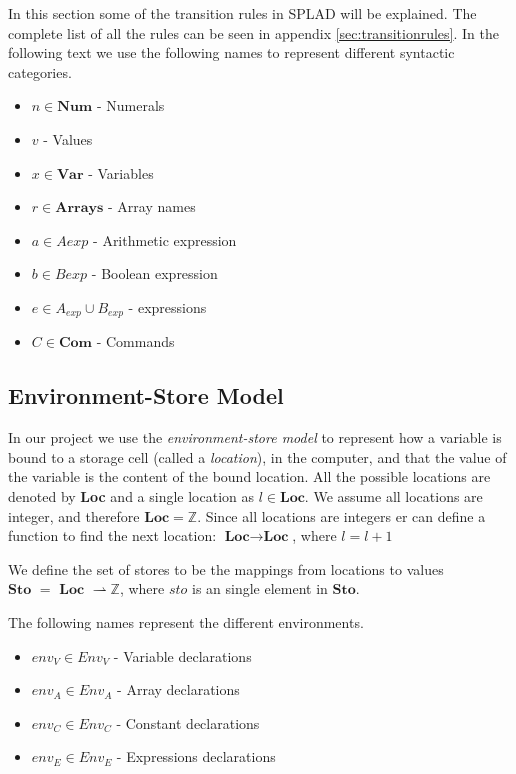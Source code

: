 In this section some of the transition rules in SPLAD will be explained. The complete list of all the rules can be seen in appendix \ref{sec:transitionrules}.
In the following text we use the following names to represent different syntactic categories.

\begin{itemize}
\item $n \in \textbf{Num}$ - Numerals
\item $v$ - Values
\item $x \in \textbf{Var}$ - Variables 
\item $r \in \textbf{Arrays}$ - Array names
\item $a \in A{exp}$ - Arithmetic expression
\item $b \in B{exp}$ - Boolean expression
\item $e \in A_{exp} \cup B_{exp}$ - expressions
\item $C \in \textbf{Com}$ - Commands
\end{itemize}

\subsection{Environment-Store Model}
In our project we use the \textit{environment-store model} to represent how a variable is bound to a storage cell (called a \textit{location}), in the computer, and that the value of the variable is the content of the bound location. All the possible locations are denoted by \textbf{Loc} and a single location as $l \in \textbf{Loc}$. We assume all locations are integer, and therefore $\textbf{Loc} = \mathbb{Z}$. Since all locations are integers er can define a function to find the next location: $\textbf{Loc} \rightarrow \textbf{Loc}$, where $l = l + 1$

We define the set of stores to be the mappings from locations to values $\textbf{Sto } = \textbf{ Loc } \rightharpoonup \mathbb{Z}$, where $sto$ is an single element in $\textbf{Sto}$.

The following names represent the different environments.
\begin{itemize}
\item $env_V \in Env_V$ - Variable declarations
\item $env_A \in Env_A$ - Array declarations
\item $env_C \in Env_C$ - Constant declarations
\item $env_E \in Env_E$ - Expressions declarations
\end{itemize}

